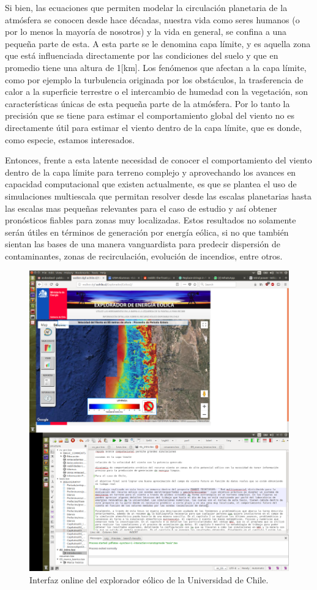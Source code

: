 Si bien, las ecuaciones que permiten modelar la circulación planetaria de la atmósfera se conocen desde hace décadas, nuestra vida como seres humanos (o por lo menos la mayoría de nosotros) y la vida en general, se confina a una pequeña parte de esta. A esta parte se le denomina capa límite, y es aquella zona que está influenciada directamente por las condiciones del suelo y que en promedio tiene una altura de 1[km]. Los fenómenos que afectan a la capa límite, como por ejemplo la turbulencia originada por los obstáculos, la trasferencia de calor a la superficie terrestre o el intercambio de humedad con la vegetación, son características únicas de esta pequeña parte de la atmósfera. Por lo tanto la precisión que se tiene para estimar el comportamiento global del viento no es directamente útil para estimar el viento dentro de la capa límite, que es donde, como especie, estamos interesados. 

Entonces, frente a esta latente necesidad de conocer el comportamiento del viento dentro de la capa límite para terreno complejo y aprovechando los avances en capacidad computacional que existen actualmente, es que se plantea el uso de simulaciones multiescala que permitan resolver desde las escalas planetarias hasta las escalas mas pequeñas relevantes para el caso de estudio y así obtener pronósticos fiables para zonas muy localizadas. Estos resultados no solamente serán útiles en términos de generación por energía eólica, si no que también sientan las bases de una manera vanguardista para predecir dispersión de contaminantes, zonas de recirculación, evolución de incendios, entre otros.

\begin{figure}[h]
	\centering
	\includegraphics[width=0.9\linewidth,trim={1.4cm 28cm 15cm 3.4cm},clip]{Imagenes/01/explo}
	\caption{Interfaz online del explorador eólico de la Universidad de Chile.}
	\label{fig:01_explorador}
\end{figure}

